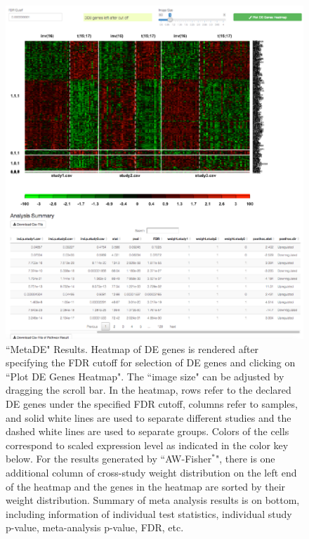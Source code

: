 \begin{figure}[H]
\begin{center}
\includegraphics[scale=1]{./figure/metaDE/metaDEresult.pdf}
\caption{``MetaDE" Results.
Heatmap of DE genes is rendered after specifying the FDR cutoff for selection of DE genes and clicking on ``Plot DE Genes Heatmap". 
The ``image size" can be adjusted by dragging the scroll bar. 
In the heatmap, rows refer to the declared DE genes under the specified FDR cutoff, 
columns refer to samples, and solid white lines are used to separate different studies and the dashed white lines are used to separate groups. 
Colors of the cells correspond to scaled expression level as indicated in the color key below. 
For the results generated by ``AW-Fisher$^{\ast}$", there is one additional column of cross-study weight distribution on the left end of the heatmap and the genes in the heatmap are sorted by their weight distribution.
Summary of meta analysis results is on bottom, 
including information of individual test statistics, individual study p-value, meta-analysis p-value, FDR, etc. 
}
\label{fig:MetaDEresult1}
\end{center}
\end{figure}

